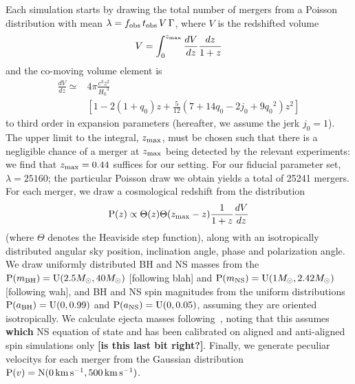 \documentclass[twocolumn]{aastex63}
\newcommand{\msun}{M_\odot}
\newcommand{\hubble}{\ensuremath{H_0}}
\newcommand{\decel}{\ensuremath{q_0}}
\newcommand{\jerk}{\ensuremath{j_0}}
\newcommand{\zmax}{\ensuremath{z_{\rm max}}}
\newcommand{\prob}{\ensuremath{{\rm P}}}
\newcommand{\normal}{{\rm{N}}}
\newcommand{\abh}{a_{\rm BH}}
\newcommand{\ans}{a_{\rm NS}}
\newcommand{\mbh}{m_{\rm BH}}
\newcommand{\mns}{m_{\rm NS}}
\newcommand{\uniform}{{\rm U}}
\newcommand{\tobs}{t_{\rm obs}}
\newcommand{\fobs}{f_{\rm obs}}
\newcommand{\step}{\Theta}
\newcommand{\kms}{\ensuremath{{\rm km\,s^{-1}}}}
\begin{document}
Each simulation starts by drawing the total number of mergers from a Poisson distribution with mean $\lambda = \fobs \, \tobs \, V \, \Gamma $, where $V$ is the redshifted volume
\begin{equation}
V = \int_0^{\zmax} \frac{dV}{dz} \frac{dz}{1+z}
\end{equation}
and the co-moving volume element is
\begin{align}
\frac{dV}{dz} \simeq & 4\pi \frac{c^3 z^2}{\hubble^3} \\
& \left[1 - 2 \left(1 + \decel \right) z + \frac{5}{12} \left(7 + 14 \decel - 2 \jerk + 9 \decel^2 \right) z^2 \right] \nonumber
\end{align}
to third order in expansion parameters (hereafter, we assume the jerk $j_0 = 1$). The upper limit to the integral, $\zmax$, must be chosen such that there is a negligible chance of a merger at $\zmax$ being detected by the relevant experiments: we find that $\zmax=0.44$ suffices for our setting. For our fiducial parameter set, $\lambda = 25160$; the particular Poisson draw we obtain yields a total of 25241 mergers. For each merger, we draw a cosmological redshift from the distribution
\begin{equation}
\prob(z) \propto \step(z) \step(\zmax-z) \frac{1}{1+z} \frac{dV}{dz}
\end{equation}
(where $\step$ denotes the Heaviside step function), along with an isotropically distributed angular sky position, inclination angle, phase and polarization angle. We draw uniformly distributed BH and NS masses from the $\prob(\mbh) = \uniform(2.5\msun, 40\msun)$ [following blah] and  $\prob(\mns) = \uniform(1\msun, 2.42\msun)$ [following wah], and BH and NS spin magnitudes from the uniform distributions $\prob(\abh) = \uniform(0, 0.99)$ and  $\prob(\ans) = \uniform(0, 0.05)$, assuming they are oriented isotropically. We calculate ejecta masses following~\cite{Foucart_etal:2018}, noting that this assumes {\bf which} NS equation of state and has been calibrated on aligned and anti-aligned spin simulations only {\bf [is this last bit right?]}. Finally, we generate peculiar velocitys for each merger from the Gaussian distribution $\prob(v) = \normal(0\,\kms,500\,\kms)$.
\end{document}
